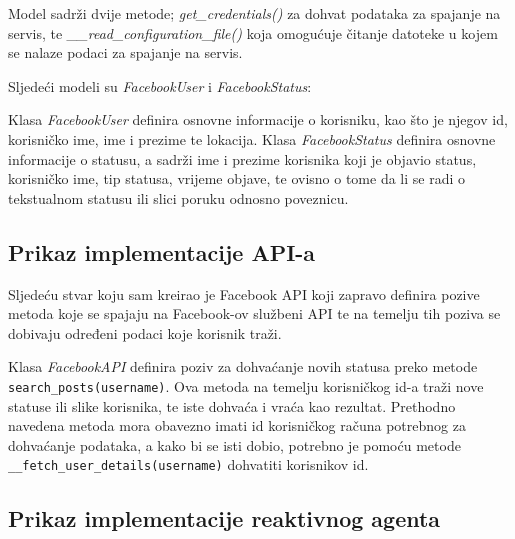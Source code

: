\documentclass[a4paper,12pt]{foi}
\begin{document}
Model sadrži dvije metode; \textit{get\_credentials()} za dohvat podataka za spajanje na servis, te \textit{\_\_read\_configuration\_file()} koja omogućuje čitanje datoteke u kojem se nalaze podaci za spajanje na servis.

Sljedeći modeli su \textit{FacebookUser} i \textit{FacebookStatus}:

\lstset{commentstyle=\textit,language=python}


Klasa \textit{FacebookUser} definira osnovne informacije o korisniku, kao što je njegov id, korisničko ime, ime i prezime te lokacija. Klasa \textit{FacebookStatus} definira osnovne informacije o statusu, a sadrži ime i prezime korisnika koji je objavio status, korisničko ime, tip statusa, vrijeme objave, te ovisno o tome da li se radi o tekstualnom statusu ili slici poruku odnosno poveznicu.

\subsection{Prikaz implementacije API-a}

Sljedeću stvar koju sam kreirao je Facebook API koji zapravo definira pozive metoda koje se spajaju na Facebook-ov službeni API te na temelju tih poziva se dobivaju određeni podaci koje korisnik traži.

\lstset{commentstyle=\textit,language=python}


Klasa \textit{FacebookAPI} definira poziv za dohvaćanje novih statusa preko metode \texttt{search\_posts(username)}. Ova metoda na temelju korisničkog id-a traži nove statuse ili slike korisnika, te iste dohvaća i vraća kao rezultat. Prethodno navedena metoda mora obavezno imati id korisničkog računa potrebnog za dohvaćanje podataka, a kako bi se isti dobio, potrebno je pomoću metode \texttt{\_\_fetch\_user\_details(username)} dohvatiti korisnikov id.

\subsection{Prikaz implementacije reaktivnog agenta}
\end{document}
